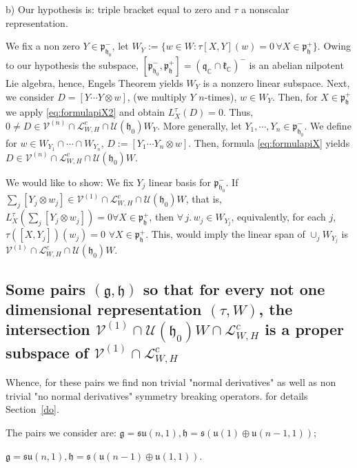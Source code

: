 \documentclass[12pt]{amsart}
\theoremstyle{definition}
\theoremstyle{remark}
\newcommand{\g}{\mathfrak{g}}
\newcommand{\h}{\mathfrak{h}}
\renewcommand{\k}{{\mathfrak k}}
\newcommand{\p}{\mathfrak p}
\newcommand{\q}{\mathfrak q}
\newcommand{\C}{{\mathbb C}}
\numberwithin{equation}{section}
\begin{document}
b) Our
hypothesis is: triple bracket equal to zero and $\tau$ a nonscalar representation.

We fix a non zero $Y\in \p_{\h_0}^-$, let $W_Y :=\{ w \in W : \tau[X,Y](w)=0 \, \forall X \in \p_{\h}^+ \}$. Owing to our hypothesis the subspace, $[\p_{\h_0}^-, \p_\h^+]= (\q_\C \cap \k_\C)^-$ is an abelian nilpotent Lie algebra, hence, Engels Theorem yields $W_Y$ is a nonzero linear subspace.
Next, we consider $D=[Y\cdots Y \otimes w]$, (we multiply $Y$ $n$-times),  $w \in W_Y $. Then, for $X\in \p_{\h}^+$
  we apply \ref{eq:formulapiX2} and obtain $L_X^\tau(D)=0$. Thus, $0\not= D \in \mathcal V^{(n)}\cap \mathcal L_{W,H}^c \cap \mathcal U(\h_0)W_Y $. More generally, let $Y_1, \cdots, Y_n \in \p_{\h_0}^-$. We define for $ w \in W_{Y_1}\cap \cdots \cap W_{Y_n}$,  $D:=[Y_1 \cdots Y_n \otimes w]$. Then, formula \ref{eq:formulapiX} yields $D\in \mathcal V^{(n)}\cap \mathcal L_{W,H}^c \cap \mathcal U(\h_0)W$.








We would like to show: We fix $Y_j$    linear basis for $\p_{\h_0 }^-$. If $ \sum_j [Y_j \otimes w_j]\in \mathcal V^{(1)}\cap \mathcal L_{W,H}^c \cap \mathcal U(\h_0)W$, that is,   $L_X^\tau(\sum_j [Y_j \otimes w_j]) =0 \forall X \in \p_\h^+$, then $\forall\,j. \, w_j \in W_{Y_j}$, equivalently, for each $j$,  $\tau([X,Y_j])(w_j)=0$  $  \forall X \in \p_\h^+$. This, would imply the linear span of $\cup_j W_{Y_j}$ is $\mathcal V^{(1)}\cap \mathcal L_{W,H}^c \cap \mathcal U(\h_0)W$.

\subsection{ Some pairs $(\g,\h)$ so that   for every    not one dimensional representation $(\tau ,W)$,  the intersection   $\mathcal V^{(1)}\cap \mathcal U(\h_0)W \cap     \mathcal L_{W,H}^c$ is  a proper subspace of  $\mathcal V^{(1)}\cap\mathcal L_{W,H}^c$}
\phantom{xxxxxxxxxxxxxxxxxxxxxxxxxxxxxxxxxxxxxxxxxxxxxxxxxxxxxxxxxxxx}


 Whence, for these pairs we find non trivial "normal derivatives"  as well as non trivial "no normal derivatives" symmetry breaking operators. for details Section~\ref{do}.


 The pairs we consider are: $\g=\mathfrak{su}(n,1),   \h =\mathfrak s(\mathfrak u( 1 )\oplus \mathfrak{u}(n-1,1))$;

\noindent
$\g=\mathfrak{su}(n,1),   \h =\mathfrak s(\mathfrak u( n-1)\oplus \mathfrak{u}( 1,1))$.
\end{document}
